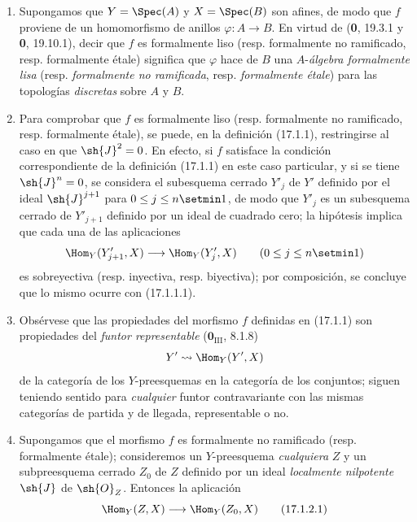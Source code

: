\begin{remarks}[17.1.2]
\label{IV.17.1.2}
\begin{enumerate}
  \item[(i)] Supongamos que $Y=\Spec(A)$ y $X=\Spec(B)$ son afines, de modo que $f$ proviene de un homomorfismo de anillos $\varphi:A\to B$. En virtud de (\textbf 0, 19.3.1 y \textbf 0, 19.10.1), decir que $f$ es formalmente liso (resp. formalmente no ramificado, resp. formalmente étale) significa que $\varphi$ hace de $B$ una $A$-\emph{álgebra formalmente lisa} (resp. \emph{formalmente no ramificada}, resp. \emph{formalmente étale}) para las topologías \emph{discretas} sobre $A$ y $B$.
  \item[(ii)] Para comprobar que $f$ es formalmente liso (resp. formalmente no ramificado, resp. formalmente étale), se puede, en la definición (17.1.1), restringirse al caso en que $\sh{J}^2=0$. En efecto, si $f$ satisface la condición correspondiente de la definición (17.1.1) en este caso particular, y si se tiene $\sh{J}^n=0$, se considera el subesquema cerrado $Y'_j$ de $Y'$ definido por el ideal $\sh{J}^{j+1}$ para $0\leq j\leq n\setmin 1$, de modo que $Y'_j$ es un subesquema cerrado de $Y'_{j+1}$ definido por un ideal de cuadrado cero; la hipótesis implica que cada una de las aplicaciones
  \[
    \Hom_Y(Y'_{j+1},X)\longrightarrow\Hom_Y(Y'_j,X)\qquad(0\leq j\leq n\setmin 1)
  \]
  es sobreyectiva (resp. inyectiva, resp. biyectiva); por composición, se concluye que lo mismo ocurre con (17.1.1.1).
  \item[(iii)] Obsérvese que las propiedades del morfismo $f$ definidas en (17.1.1) son propiedades del \emph{funtor representable} ($\mathbf 0_{\mathrm{III}}$, 8.1.8)
  \[
    Y'\leadsto\Hom_Y(Y',X)
  \]
  de la categoría de los $Y$-preesquemas en la categoría de los conjuntos; siguen teniendo sentido para \emph{cualquier} funtor contravariante con las mismas categorías de partida y de llegada, representable o no.
  \item[(iv)] Supongamos que el morfismo $f$ es formalmente no ramificado (resp. formalmente étale); consideremos un $Y$-preesquema \emph{cualquiera} $Z$ y un subpreesquema cerrado $Z_0$ de $Z$ definido por un ideal \emph{localmente nilpotente} $\sh{J}$ de $\sh{O}_Z$. Entonces la aplicación
  \[
  \label{IV.17.1.2.1}
    \Hom_Y(Z,X)\longrightarrow\Hom_Y(Z_0,X)
    \tag{17.1.2.1}
  \]

\end{enumerate}
\end{remarks}
